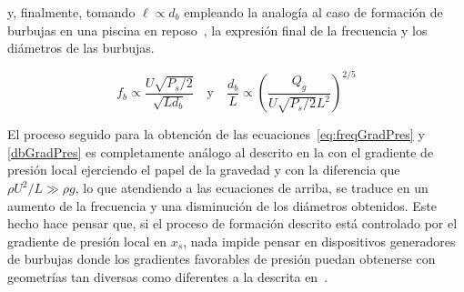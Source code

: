 y, finalmente, tomando $\ell \propto d_{b}$ empleando la analogía al caso de formación de burbujas en una piscina en reposo~\cite{Evangelio2015b}, la expresión final de la frecuencia y los diámetros de las burbujas. 

\begin{equation}
f_{b} \propto \dfrac{U\sqrt{P_{s}/2}}{\sqrt{L d_{b}}} \quad \mathrm{y} \quad \dfrac{d_{b}}{L} \propto \left(\dfrac{Q_{g}}{U\sqrt{P_{s}/2}L^{2}}\right)^{2/5}
\end{equation}

El proceso seguido para la obtención de las ecuaciones~\eqref{eq:freqGradPres} y \eqref{dbGradPres} es completamente análogo al descrito en la  con el gradiente de presión local ejerciendo el papel de la gravedad y con la diferencia que $\rho U^{2}/L \gg \rho g $, lo que atendiendo a las ecuaciones de arriba, se traduce en un aumento de la frecuencia y una disminución de los diámetros obtenidos. Este hecho hace pensar que, si el proceso de formación descrito está controlado por el gradiente de presión local en $x_{s}$, nada impide pensar en dispositivos generadores de burbujas donde los gradientes favorables de presión puedan obtenerse con geometrías tan diversas como diferentes a la descrita en~\cite{Evangelio2015b}.


